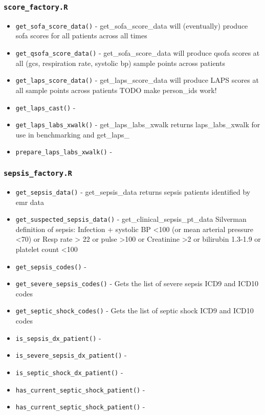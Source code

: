 \documentclass[
]{book}
\providecommand{\tightlist}{%
  \setlength{\itemsep}{0pt}\setlength{\parskip}{0pt}}
\begin{document}
\hypertarget{score_factory.r}{%
\subsubsection{\texorpdfstring{\texttt{score\_factory.R}}{score\_factory.R}}\label{score_factory.r}}

\begin{itemize}
\tightlist
\item
  \texttt{get\_sofa\_score\_data()} - get\_sofa\_score\_data will (eventually) produce sofa scores for all patients across all times
\item
  \texttt{get\_qsofa\_score\_data()} - get\_sofa\_score\_data will produce qsofa scores at all (gcs, respiration rate, systolic bp) sample points across patients
\item
  \texttt{get\_laps\_score\_data()} - get\_laps\_score\_data will produce LAPS scores at all sample points across patients TODO make person\_ids work!
\item
  \texttt{get\_laps\_cast()} -
\item
  \texttt{get\_laps\_labs\_xwalk()} - get\_laps\_labs\_xwalk returns laps\_labs\_xwalk for use in benchmarking and get\_laps\_
\item
  \texttt{prepare\_laps\_labs\_xwalk()} -
\end{itemize}

\hypertarget{sepsis_factory.r}{%
\subsubsection{\texorpdfstring{\texttt{sepsis\_factory.R}}{sepsis\_factory.R}}\label{sepsis_factory.r}}

\begin{itemize}
\tightlist
\item
  \texttt{get\_sepsis\_data()} - get\_sepsis\_data returns sepsis patients identified by emr data
\item
  \texttt{get\_suspected\_sepsis\_data()} - get\_clinical\_sepsis\_pt\_data Silverman definition of sepsis: Infection + systolic BP \textless100 (or mean arterial pressure \textless70) or Resp rate \textgreater{} 22 or pulse \textgreater100 or Creatinine \textgreater2 or bilirubin 1.3-1.9 or platelet count \textless100
\item
  \texttt{get\_sepsis\_codes()} -
\item
  \texttt{get\_severe\_sepsis\_codes()} - Gets the list of severe sepsis ICD9 and ICD10 codes
\item
  \texttt{get\_septic\_shock\_codes()} - Gets the list of septic shock ICD9 and ICD10 codes
\item
  \texttt{is\_sepsis\_dx\_patient()} -
\item
  \texttt{is\_severe\_sepsis\_dx\_patient()} -
\item
  \texttt{is\_septic\_shock\_dx\_patient()} -
\item
  \texttt{has\_current\_septic\_shock\_patient()} -
\item
  \texttt{has\_current\_septic\_shock\_patient()} -
\end{itemize}
\end{document}
